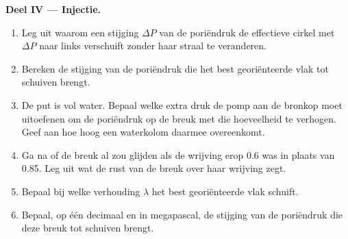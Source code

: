 \begin{problem}
\medskip
\noindent\textbf{Deel IV --- Injectie.}
\begin{enumerate}[resume]
  \item Leg uit waarom een stijging $\Delta P$ van de poriëndruk de effectieve cirkel met $\Delta P$ naar links verschuift zonder haar straal te veranderen.
  \item Bereken de stijging van de poriëndruk die het best georiënteerde vlak tot schuiven brengt.
  \item De put is vol water. Bepaal welke extra druk de pomp aan de bronkop moet uitoefenen om de poriëndruk op de breuk met die hoeveelheid te verhogen. Geef aan hoe hoog een waterkolom daarmee overeenkomt.
  \item Ga na of de breuk al zou glijden als de wrijving erop 0.6 was in plaats van 0.85. Leg uit wat de rust van de breuk over haar wrijving zegt.
  \item Bepaal bij welke verhouding $\lambda$ het best georiënteerde vlak schuift.
  \item Bepaal, op één decimaal en in megapascal, de stijging van de poriëndruk die deze breuk tot schuiven brengt.
\end{enumerate}
\end{problem}
